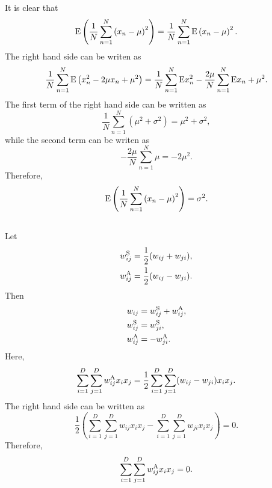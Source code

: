 \subsection{}
It is clear that
%
\begin{equation}
{\rm E} \left( \frac{1}{N} \sum_{n = 1}^{N} \left( x_n - \mu \right) ^ 2 \right) = \frac{1}{N} \sum_{n = 1}^{N} {\rm E} \left( x_n - \mu \right) ^ 2.
\end{equation}
%
The right hand side can be writen as 
%
\begin{equation}
\frac{1}{N} \sum_{n = 1}^{N} {\rm E} \left( x_n ^ 2 - 2 \mu x_n + \mu ^ 2 \right) = \frac{1}{N} \sum_{n = 1}^{N} {\rm E} x_n ^ 2 - \frac{2 \mu}{N}  \sum_{n = 1}^{N} {\rm E} x_n + \mu ^ 2.
\end{equation}
%
The first term of the right hand side can be written as 
%
\begin{equation}
\frac{1}{N} \sum_{n = 1}^{N} \left( \mu ^ 2 + \sigma ^ 2 \right) = \mu ^ 2 + \sigma ^ 2,
\end{equation}
%
while the second term can be writen as
%
\begin{equation}
- \frac{2 \mu}{N} \sum_{n = 1}^{N} \mu = - 2 \mu ^ 2.
\end{equation}
%
Therefore,
%
\begin{equation}
{\rm E} \left( \frac{1}{N} \sum_{n = 1}^{N} \left( x_n - \mu \right) ^ 2 \right) = \sigma ^2.
\end{equation}
%


\subsection{}
Let
%
\begin{equation}
\begin{aligned}
w_{ij}^{\rm S} &= \frac{1}{2} (w_{ij} + w_{ji}), \\
w_{ij}^{\rm A} &= \frac{1}{2} (w_{ij} - w_{ji}).
\end{aligned}
\end{equation}
%
Then
%
\begin{equation}
\begin{aligned}
w_{ij} &= w_{ij}^{\rm S} + w_{ij}^{\rm A}, \\
w_{ij}^{\rm S} &= w_{ji}^{\rm S}, \\
w_{ij}^{\rm A} &= - w_{ji}^{\rm A}.
\end{aligned}
\end{equation}
%
Here,
\begin{equation}
\sum_{i = 1}^{D} \sum_{j = 1}^{D} w_{ij}^{\rm A} x_i x_j = \frac{1}{2} \sum_{i = 1}^{D} \sum_{j = 1}^{D} (w_{ij} - w_{ji}) x_i x_j.
\end{equation}
%
The right hand side can be written as
%
\begin{equation}
\frac{1}{2} \left( \sum_{i = 1}^{D} \sum_{j = 1}^{D} w_{ij} x_i x_j - \sum_{i = 1}^{D} \sum_{j = 1}^{D} w_{ji} x_i x_j \right) = 0.
\end{equation}
%
Therefore, 
%
\begin{equation}
\sum_{i = 1}^{D} \sum_{j = 1}^{D} w_{ij}^{\rm A} x_i x_j = 0.
\end{equation}
%


